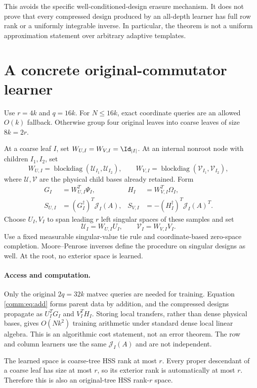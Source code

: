\documentclass[11pt,oneside,openany,a4paper]{book}
\numberwithin{equation}{chapter}
\theoremstyle{definition}
\theoremstyle{remark}
\DeclareMathOperator{\diag}{blockdiag}\DeclareMathOperator{\range}{range}
\newcommand{\J}{\mathcal J}\newcommand{\transpose}{\mathsf T}
\begin{document}
This avoids the specific well-conditioned-design erasure mechanism. It does not prove that every compressed design produced by an all-depth learner has full row rank or a uniformly integrable inverse. In particular, the theorem is not a uniform approximation statement over arbitrary adaptive templates.

\section{A concrete original-commutator learner}
Use $r=4k$ and $q=16k$. For $N\le16k$, exact coordinate queries are an allowed $O(k)$ fallback. Otherwise group four original leaves into coarse leaves of size $8k=2r$.

At a coarse leaf $I$, set $W_{U,I}=W_{V,I}=\Id_{|I|}$. At an internal nonroot node with children $I_1,I_2$, set
\[
 W_{U,I}=\diag(\mathcal U_{I_1},\mathcal U_{I_2}),\qquad
 W_{V,I}=\diag(\mathcal V_{I_1},\mathcal V_{I_2}),
\]
where $\mathcal U,\mathcal V$ are the physical child bases already retained. Form
\begin{align}
 G_I&=W_{U,I}^T\Psi_I,& H_I&=W_{V,I}^T\Omega_I,\\
 S_{U,I}&=(G_I^\dagger)^T\J_I(A),&
 S_{V,I}&=-(H_I^\dagger)^T\J_I(A)^T.\label{comm:eq:learner}
\end{align}
Choose $U_I,V_I$ to span leading $r$ left singular spaces of these samples and set
\[
 \mathcal U_I=W_{U,I}U_I,\qquad\mathcal V_I=W_{V,I}V_I.
\]
Use a fixed measurable singular-value tie rule and coordinate-based zero-space completion. Moore--Penrose inverses define the procedure on singular designs as well. At the root, no exterior space is learned.

\paragraph{Access and computation.}
Only the original $2q=32k$ matvec queries are needed for training. Equation \eqref{comm:eq:add} forms parent data by addition, and the compressed designs propagate as $U_I^TG_I$ and $V_I^TH_I$. Storing local transfers, rather than dense physical bases, gives $O(Nk^2)$ training arithmetic under standard dense local linear algebra. This is an algorithmic cost statement, not an error theorem. The row and column learners use the same $\J_I(A)$ and are not independent.

The learned space is coarse-tree HSS rank at most $r$. Every proper descendant of a coarse leaf has size at most $r$, so its exterior rank is automatically at most $r$. Therefore this is also an original-tree HSS rank-$r$ space.
\end{document}
